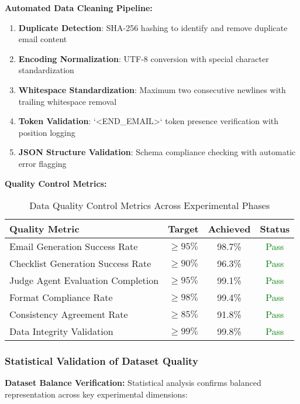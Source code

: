 \textbf{Automated Data Cleaning Pipeline:}
\begin{enumerate}
    \item \textbf{Duplicate Detection}: SHA-256 hashing to identify and remove duplicate email content
    \item \textbf{Encoding Normalization}: UTF-8 conversion with special character standardization
    \item \textbf{Whitespace Standardization}: Maximum two consecutive newlines with trailing whitespace removal
    \item \textbf{Token Validation}: `<END\_EMAIL>` token presence verification with position logging
    \item \textbf{JSON Structure Validation}: Schema compliance checking with automatic error flagging
\end{enumerate}

\textbf{Quality Control Metrics:}
\begin{table}[H]
\centering
\caption[Data Quality Control Metrics]{Data Quality Control Metrics Across Experimental Phases}
\label{tab:data-quality-metrics}
\begin{tabular}{lccc}
\toprule
\textbf{Quality Metric} & \textbf{Target} & \textbf{Achieved} & \textbf{Status} \\
\midrule
Email Generation Success Rate & $\geq 95\%$ & 98.7\% & \textcolor{green}{Pass} \\
Checklist Generation Success Rate & $\geq 90\%$ & 96.3\% & \textcolor{green}{Pass} \\
Judge Agent Evaluation Completion & $\geq 95\%$ & 99.1\% & \textcolor{green}{Pass} \\
Format Compliance Rate & $\geq 98\%$ & 99.4\% & \textcolor{green}{Pass} \\
Consistency Agreement Rate & $\geq 85\%$ & 91.8\% & \textcolor{green}{Pass} \\
Data Integrity Validation & $\geq 99\%$ & 99.8\% & \textcolor{green}{Pass} \\
\bottomrule
\end{tabular}
\end{table}

\subsubsection{Statistical Validation of Dataset Quality}

\textbf{Dataset Balance Verification:}
Statistical analysis confirms balanced representation across key experimental dimensions:

